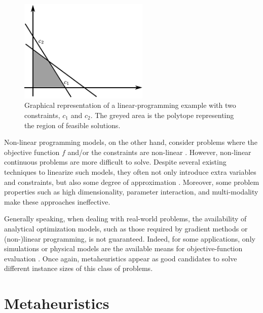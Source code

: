 \begin{figure}
\centering

\includegraphics[width=0.55\textwidth]{02-background_and_motivation/img/linear_programming}

\caption{Graphical representation of a linear-programming example with two
constraints, $c_{1}$ and $c_{2}$. The greyed area is the polytope
representing the region of feasible solutions. \label{fig:02-linear_programming_example}}
\end{figure}


Non-linear programming models, on the other hand, consider problems
where the objective function $f$ and/or the constraints are non-linear
\cite{Bazaraa-Nonlinear_programming:2006}. However, non-linear continuous
problems are more difficult to solve. Despite several existing techniques
to linearize such models, they often not only introduce extra variables
and constraints, but also some degree of approximation \cite{Glover-Improved_linear_programming_formulations_for_nonlinear_problems:1975}.
Moreover, some problem properties such as high dimensionality, parameter
interaction, and multi-modality make these approaches ineffective.

\bigskip{}


Generally speaking, when dealing with real-world problems, the availability
of analytical optimization models, such as those required by gradient
methods or (non-)linear programming, is not guaranteed. Indeed, for
some applications, only simulations or physical models are the available
means for objective-function evaluation \cite{Fu-Optimization_for_simulation:2002}.
Once again, metaheuristics appear as good candidates to solve different
instance sizes of this class of problems. 


\section{Metaheuristics \label{sec:02-Metaheuristics}}

